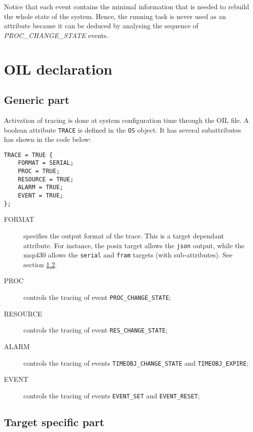 Notice that each event contains the minimal information that is needed
to rebuild the whole state of the system.
Hence, the running task is never used as an attribute because it can be deduced
by analysing the sequence of \emph{PROC\_CHANGE\_STATE} events.

\section{OIL declaration}
\subsection{Generic part}

Activation of tracing is done at system configuration time through the OIL file.
A boolean attribute \texttt{TRACE} is defined in the \texttt{OS} object. It has
several subattributes has shown in the code below:

\begin{lstlisting}[language=OIL]
TRACE = TRUE {
    FORMAT = SERIAL;
    PROC = TRUE;
    RESOURCE = TRUE;
    ALARM = TRUE;
    EVENT = TRUE;
};
\end{lstlisting}

\begin{description}
	\item[FORMAT] specifies the output format of the trace. This is a target dependant attribute. For instance, the posix target allows the \texttt{json} output, while the msp430 allows the \texttt{serial} and \texttt{fram} targets (with sub-attributes). See section \ref{sec:traceTargetFormat}.

  \item[PROC] controls the tracing of event \texttt{PROC\_CHANGE\_STATE};

  \item[RESOURCE] controls the tracing of event \texttt{RES\_CHANGE\_STATE};

  \item[ALARM] controls the tracing of events \texttt{TIMEOBJ\_CHANGE\_STATE}
    and \texttt{TIMEOBJ\_EXPIRE};

  \item[EVENT]  controls the tracing of events \texttt{EVENT\_SET}
    and \texttt{EVENT\_RESET};
\end{description}

\subsection{Target specific part}
\label{sec:traceTargetFormat}
